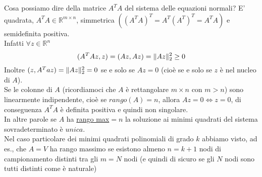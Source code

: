 \documentclass[12pt,a4paper]{article}
\DeclarePairedDelimiter{\norma}{\lVert}{\rVert}
\begin{document}
\vspace{0.2cm}
Cosa possiamo dire della matrice $A^TA$ del sistema delle equazioni normali?
E' quadrata, $A^TA \in \mathbb{R}^{m\times n}$, simmetrica $((A^TA)^T = A^T(A^T)^T = A^TA)$ e semidefinita positiva. \\
Infatti $\forall z \in \mathbb{R}^n$
\begin{equation*}
    (A^TAz,z) = (Az,Az)=\norma{Az}_2^2 \geq 0
\end{equation*}
Inoltre $(z,A^Taz)=\norma{Az}_2^2=0$ se e solo se $Az=0$ (cioè se e solo se $z$ è nel nucleo di $A$). \\
Se le colonne di $A$ (ricordiamoci che $A$ è rettangolare $m\times n$ con $m>n$) sono linearmente indipendente, cioè se $rango(A)=n$, allora $Az=0 \Leftrightarrow z = 0$, di conseguenza $A^TA$ è definita positiva e quindi non singolare. \\
In altre parole se $A$ ha \uline{rango max}$=n$ la soluzione ai minimi quadrati del sistema sovradeterminato è $unica$. \\
Nel caso particolare dei minimi quadrati polinomiali di grado $k$ abbiamo visto, ad es., che $A=V$ ha rango massimo se esistono almeno $n=k+1$ nodi di campionamento distinti tra gli $m=N$ nodi (e quindi di sicuro se gli $N$ nodi sono tutti distinti come è naturale)
\end{document}
